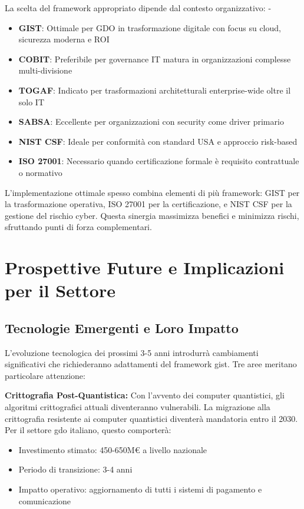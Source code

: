 La scelta del framework appropriato dipende dal contesto organizzativo: - \begin{itemize}
    \item \textbf{GIST}: Ottimale per GDO in trasformazione digitale con focus
    su cloud, sicurezza moderna e ROI
    \item \textbf{COBIT}: Preferibile per governance IT matura in organizzazioni complesse multi-divisione
    \item \textbf{TOGAF}: Indicato per trasformazioni architetturali enterprise-wide oltre il solo IT
    \item \textbf{SABSA}: Eccellente per organizzazioni con security come driver primario
    \item \textbf{NIST CSF}: Ideale per conformità con standard USA e approccio risk-based 
    \item \textbf{ISO 27001}: Necessario quando certificazione formale è
    requisito contrattuale o normativo
\end{itemize}
L’implementazione ottimale spesso combina elementi di più framework: GIST per la trasformazione operativa, ISO 27001 per la certificazione, e NIST CSF per la gestione del rischio cyber. Questa sinergia massimizza benefici e minimizza rischi, sfruttando punti di forza complementari.

\section{\texorpdfstring{Prospettive Future e Implicazioni per il Settore}{5.5 - Prospettive Future e Implicazioni per il Settore}}
\label{sec:5.5}

\subsection{\texorpdfstring{Tecnologie Emergenti e Loro Impatto}{5.5.1 - Tecnologie Emergenti e Loro Impatto}}
\label{subsec:5.5.1}

L'evoluzione tecnologica dei prossimi 3-5 anni introdurrà cambiamenti significativi che richiederanno adattamenti del framework \gls{gist}. Tre aree meritano particolare attenzione:

\textbf{Crittografia Post-Quantistica:} Con l'avvento dei computer quantistici, gli algoritmi crittografici attuali diventeranno vulnerabili. La migrazione alla crittografia resistente ai computer quantistici diventerà mandatoria entro il 2030. Per il settore \gls{gdo} italiano, questo comporterà:
\begin{itemize}
\item Investimento stimato: 450-650M€ a livello nazionale
\item Periodo di transizione: 3-4 anni
\item Impatto operativo: aggiornamento di tutti i sistemi di pagamento e comunicazione
\end{itemize}

